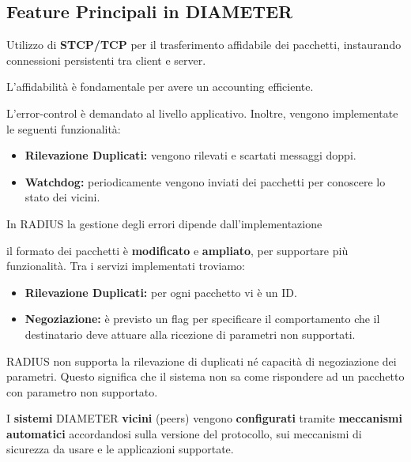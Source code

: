 \subsection{Feature Principali in DIAMETER}
\begin{proposition}
 Utilizzo di \textbf{STCP/TCP} per il trasferimento affidabile dei pacchetti, instaurando connessioni persistenti tra client e server.
\end{proposition}
\begin{note}
    L'affidabilità è fondamentale per avere un accounting efficiente.
\end{note}
\begin{proposition}
 L'error-control è demandato al livello applicativo. Inoltre, vengono implementate le seguenti funzionalità:
    \begin{itemize}
        \item \textbf{Rilevazione Duplicati:} vengono rilevati e scartati messaggi doppi.
        \item \textbf{Watchdog:} periodicamente vengono inviati dei pacchetti per conoscere lo stato dei vicini.
    \end{itemize}
\end{proposition}
\begin{note}
    In RADIUS la gestione degli errori dipende dall'implementazione
\end{note}
\begin{proposition}
il formato dei pacchetti è \textbf{modificato} e \textbf{ampliato}, per supportare più funzionalità. Tra i servizi implementati troviamo: 
    \begin{itemize}
         \item \textbf{Rilevazione Duplicati:} per ogni pacchetto vi è un ID.
        \item \textbf{Negoziazione:} è previsto un flag per specificare il comportamento che il destinatario deve attuare alla ricezione di parametri non supportati. 
    \end{itemize}
\end{proposition}
\begin{remark}
    RADIUS non supporta la rilevazione di duplicati né capacità di negoziazione dei parametri. Questo significa che il sistema non sa come rispondere ad un pacchetto con parametro non supportato.
\end{remark}
\begin{proposition}
I \textbf{sistemi} DIAMETER \textbf{vicini} (peers) vengono \textbf{configurati} tramite \textbf{meccanismi automatici} accordandosi sulla versione del protocollo, sui meccanismi di sicurezza da usare e le applicazioni supportate.
\end{proposition}
